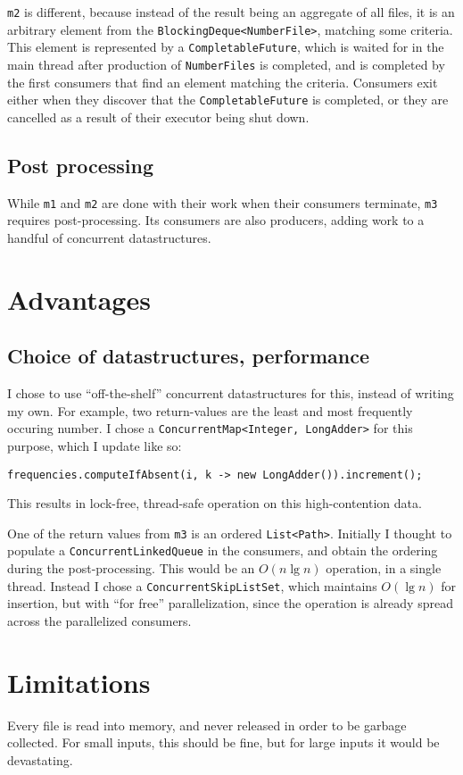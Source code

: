 \documentclass[a4paper,11pt]{article}
\begin{document}
\texttt{m2} is different, because instead of the result being an
aggregate of all files, it is an arbitrary element from the
\texttt{BlockingDeque<NumberFile>}, matching some criteria.  This element
is represented by a \texttt{CompletableFuture}, which is waited for in
the main thread after production of \texttt{NumberFiles} is completed,
and is completed by the first consumers that find an element matching
the criteria.  Consumers exit either when they discover that the
\texttt{CompletableFuture} is completed, or they are cancelled as a
result of their executor being shut down.

\subsection{Post processing}

While \texttt{m1} and \texttt{m2} are done with their work when their
consumers terminate, \texttt{m3} requires post-processing.  Its
consumers are also producers, adding work to a handful of concurrent
datastructures.   

\section{Advantages}

\subsection{Choice of datastructures, performance}

I chose to use ``off-the-shelf'' concurrent datastructures for this,
instead of writing my own.  For example, two return-values are the
least and most frequently occuring number.  I chose a
\texttt{ConcurrentMap<Integer, LongAdder>} for this purpose, which I
update like so:

\begin{verbatim}
frequencies.computeIfAbsent(i, k -> new LongAdder()).increment();
\end{verbatim}

This results in lock-free, thread-safe operation on this
high-contention data.

One of the return values from \texttt{m3} is an ordered
\texttt{List<Path>}.  Initially I thought to populate a
\texttt{ConcurrentLinkedQueue} in the consumers, and obtain the
ordering during the post-processing.  This would be an \(O(n \lg n) \)
operation, in a single thread.  Instead I chose a
\texttt{ConcurrentSkipListSet}, which maintains $O(\lg n)$ for
insertion, but with ``for free'' parallelization, since the operation
is already spread across the parallelized consumers.

\section{Limitations}

Every file is read into memory, and never released in order to be
garbage collected.  For small inputs, this should be fine, but for
large inputs it would be devastating.
\end{document}
